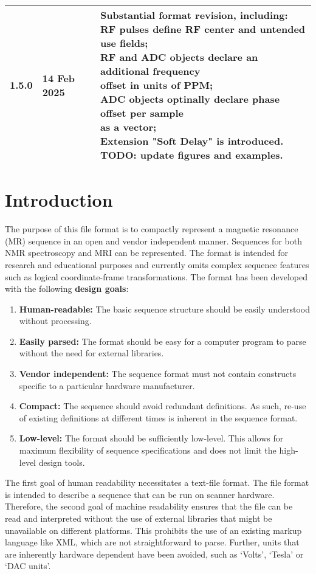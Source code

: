 \documentclass{article}
\begin{document}
\begin{tabular}{lll}
1.5.0 & 14 Feb 2025 & \makecell{Substantial format revision, including: \\
RF pulses define RF center and untended use fields; \\
RF and ADC objects declare an additional frequency \\ offset in units of PPM; \\
ADC objects optinally declare phase offset per sample \\ as a vector; \\
Extension "Soft Delay" is introduced. \\
TODO: update figures and examples.  \\
} \\
\bottomrule
\end{tabular}


\section{Introduction}
The purpose of this file format is to compactly represent a magnetic resonance (MR) sequence in an open and vendor independent manner. Sequences for both NMR spectroscopy and MRI can be represented. The format is intended for research and educational purposes and currently omits complex sequence features such as logical coordinate-frame transformations. The format has been developed with the following \textbf{design goals}:
\begin{enumerate}
\item \textbf{Human-readable:} The basic sequence structure should be easily understood without processing.
\item \textbf{Easily parsed:} The format should be easy for a computer program to parse without the need for external libraries.
\item \textbf{Vendor independent:} The sequence format must not contain constructs specific to a particular hardware manufacturer.
\item \textbf{Compact:} The sequence should avoid redundant definitions. As such, re-use of existing definitions at different times is inherent in the sequence format.
\item \textbf{Low-level:} The format should be sufficiently low-level. This allows for maximum flexibility of sequence specifications and does not limit the high-level design tools.
\end{enumerate}

The first goal of human readability necessitates a text-file format. The file format is intended to describe a sequence that can be run on scanner hardware. Therefore, the second goal of machine readability ensures that the file can be read and interpreted without the use of external libraries that might be unavailable on different platforms. This prohibits the use of an existing markup language like XML, which are not straightforward to parse. Further, units  that are inherently hardware dependent have been avoided, such as `Volts', `Tesla' or  `DAC units'. 
\end{document}
